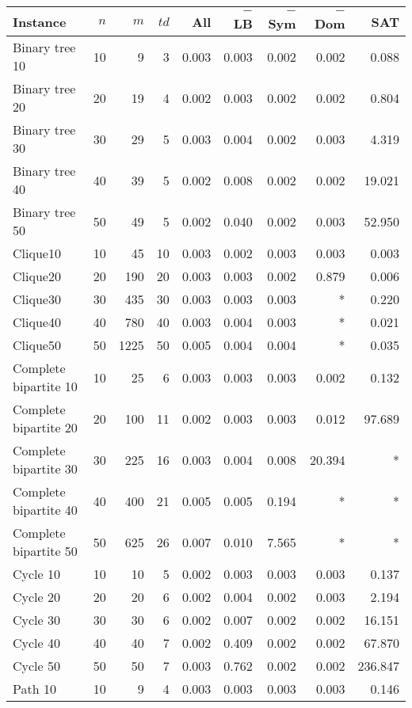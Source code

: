 \begin{table}[htb]
\centering
 \begin{tabular}{l r r r r r r r r} 
 \toprule
 Instance & $n$ & $m$ & $\mathit{td}$ & All & $-$LB & $-$Sym & $-$Dom & SAT \\ [0.5ex] 
 \midrule
Binary tree 10 & 10 & 9 & 3 & 0.003 & 0.003 & 0.002 & 0.002 & 0.088 \\
Binary tree 20 & 20 & 19 & 4 & 0.002 & 0.003 & 0.002 & 0.002 & 0.804 \\
Binary tree 30 & 30 & 29 & 5 & 0.003 & 0.004 & 0.002 & 0.003 & 4.319 \\
Binary tree 40 & 40 & 39 & 5 & 0.002 & 0.008 & 0.002 & 0.002 & 19.021 \\
Binary tree 50 & 50 & 49 & 5 & 0.002 & 0.040 & 0.002 & 0.003 & 52.950 \\
\addlinespace[0.5em]
Clique10 & 10 & 45 & 10 & 0.003 & 0.002 & 0.003 & 0.003 & 0.003 \\
Clique20 & 20 & 190 & 20 & 0.003 & 0.003 & 0.002 & 0.879 & 0.006 \\
Clique30 & 30 & 435 & 30 & 0.003 & 0.003 & 0.003 & * & 0.220 \\
Clique40 & 40 & 780 & 40 & 0.003 & 0.004 & 0.003 & * & 0.021 \\
Clique50 & 50 & 1225 & 50 & 0.005 & 0.004 & 0.004 & * & 0.035 \\
\addlinespace[0.5em]
Complete bipartite 10 & 10 & 25 & 6 & 0.003 & 0.003 & 0.003 & 0.002 & 0.132 \\
Complete bipartite 20 & 20 & 100 & 11 & 0.002 & 0.003 & 0.003 & 0.012 & 97.689 \\
Complete bipartite 30 & 30 & 225 & 16 & 0.003 & 0.004 & 0.008 & 20.394 & * \\
Complete bipartite 40 & 40 & 400 & 21 & 0.005 & 0.005 & 0.194 & * & * \\
Complete bipartite 50 & 50 & 625 & 26 & 0.007 & 0.010 & 7.565 & * & * \\
\addlinespace[0.5em]
Cycle 10 & 10 & 10 & 5 & 0.002 & 0.003 & 0.003 & 0.003 & 0.137 \\
Cycle 20 & 20 & 20 & 6 & 0.002 & 0.004 & 0.002 & 0.003 & 2.194 \\
Cycle 30 & 30 & 30 & 6 & 0.002 & 0.007 & 0.002 & 0.002 & 16.151 \\
Cycle 40 & 40 & 40 & 7 & 0.002 & 0.409 & 0.002 & 0.002 & 67.870 \\
Cycle 50 & 50 & 50 & 7 & 0.003 & 0.762 & 0.002 & 0.002 & 236.847 \\
\addlinespace[0.5em]
Path 10 & 10 & 9 & 4 & 0.003 & 0.003 & 0.003 & 0.003 & 0.146 \\

\end{tabular}
\end{table}
